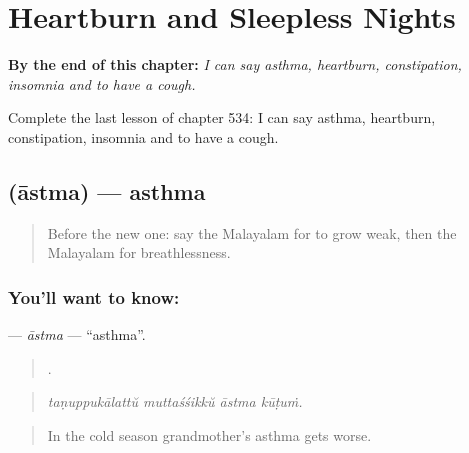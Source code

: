 
\chapter{Heartburn and Sleepless Nights}
\label{ch:ml-heartburn-and-sleepless-nights}

\begin{chapteropening}
\textbf{By the end of this chapter:} \emph{I can say asthma, heartburn, constipation, insomnia and to have a cough.}

Complete the last lesson of chapter 534: I can say asthma, heartburn, constipation, insomnia and to have a cough.
\end{chapteropening}

\section[\texorpdfstring{\ml{ആസ്ത്മ} (āstma)}{ആസ്ത്മ (āstma)}]{ (āstma) — asthma}

\label{lesson:ML-C534-astma}



\begin{quote}
Before the new one: say the Malayalam for to grow weak, then the Malayalam for breathlessness.
\end{quote}

\subsection*{You'll want to know: }
\textbf{} — \emph{āstma} — \textquotedblleft{}asthma\textquotedblright{}.

\begin{quote}
   .
\end{quote}

\begin{quote}
\emph{taṇuppukālattŭ muttaśśikkŭ āstma kūṭuṁ.}
\end{quote}

\begin{quote}
In the cold season grandmother's asthma gets worse.
\end{quote}

